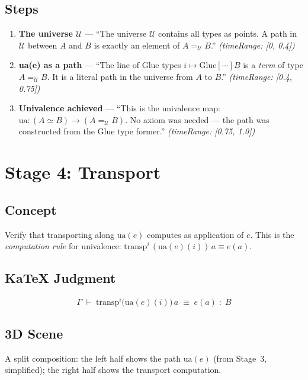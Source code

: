 \documentclass[11pt,a4paper]{article}
\begin{document}
\subsection{Steps}

\begin{enumerate}
  \item \textbf{The universe $\mathcal{U}$} — ``The universe $\mathcal{U}$
    contains all types as points. A path in $\mathcal{U}$ between $A$ and $B$
    is exactly an element of $A =_{\mathcal{U}} B$.''
    \textit{(timeRange: [0, 0.4])}
  \item \textbf{ua(e) as a path} — ``The line of Glue types $i \mapsto
    \mathrm{Glue}[\cdots]B$ is a \emph{term} of type $A =_{\mathcal{U}} B$.
    It is a literal path in the universe from $A$ to $B$.''
    \textit{(timeRange: [0.4, 0.75])}
  \item \textbf{Univalence achieved} — ``This is the univalence map:
    $\mathrm{ua} : (A \simeq B) \to (A =_{\mathcal{U}} B)$.  No axiom was
    needed — the path was constructed from the Glue type former.''
    \textit{(timeRange: [0.75, 1.0])}
\end{enumerate}

\section{Stage 4: Transport}

\subsection{Concept}

Verify that transporting along $\mathrm{ua}(e)$ computes as application of $e$.
This is the \emph{computation rule} for univalence:
$\mathrm{transp}^i\,(\mathrm{ua}(e)(i))\,a \equiv e(a)$.

\subsection{KaTeX Judgment}

\[
  \Gamma \;\vdash\; \mathrm{transp}^i\bigl(\mathrm{ua}(e)(i)\bigr)\,a
  \;\equiv\; e(a) \;:\; B
\]

\subsection{3D Scene}

A split composition: the left half shows the path $\mathrm{ua}(e)$ (from
Stage~3, simplified); the right half shows the transport computation.
\end{document}
